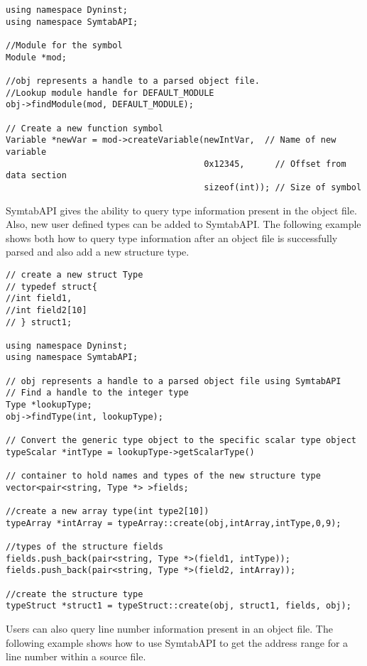 \begin{lstlisting}
using namespace Dyninst;
using namespace SymtabAPI;

//Module for the symbol
Module *mod;

//obj represents a handle to a parsed object file.
//Lookup module handle for DEFAULT_MODULE 
obj->findModule(mod, DEFAULT_MODULE);

// Create a new function symbol
Variable *newVar = mod->createVariable(newIntVar,  // Name of new variable
                                       0x12345,      // Offset from data section
                                       sizeof(int)); // Size of symbol 
\end{lstlisting}

SymtabAPI gives the ability to query type information present in the object file. Also, new user defined types can be added to SymtabAPI. The following example shows both how to query type information after an object file is successfully parsed and also add a new structure type.

\begin{lstlisting}
// create a new struct Type
// typedef struct{
//int field1,
//int field2[10]
// } struct1;

using namespace Dyninst;
using namespace SymtabAPI;

// obj represents a handle to a parsed object file using SymtabAPI
// Find a handle to the integer type
Type *lookupType;
obj->findType(int, lookupType);

// Convert the generic type object to the specific scalar type object
typeScalar *intType = lookupType->getScalarType()

// container to hold names and types of the new structure type
vector<pair<string, Type *> >fields;

//create a new array type(int type2[10])
typeArray *intArray = typeArray::create(obj,intArray,intType,0,9);

//types of the structure fields
fields.push_back(pair<string, Type *>(field1, intType));
fields.push_back(pair<string, Type *>(field2, intArray));

//create the structure type
typeStruct *struct1 = typeStruct::create(obj, struct1, fields, obj);
\end{lstlisting}

Users can also query line number information present in an object file. The following example shows how to use SymtabAPI to get the address range for a line number within a source file.

